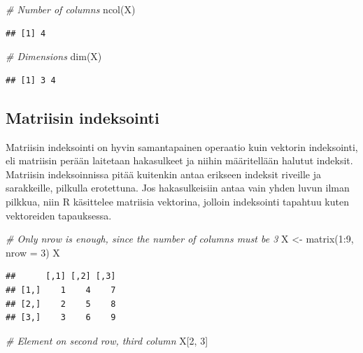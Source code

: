 \documentclass[
]{book}
\newenvironment{Shaded}{\begin{snugshade}}{\end{snugshade}}
\newcommand{\AttributeTok}[1]{\textcolor[rgb]{0.77,0.63,0.00}{#1}}
\newcommand{\CommentTok}[1]{\textcolor[rgb]{0.56,0.35,0.01}{\textit{#1}}}
\newcommand{\DecValTok}[1]{\textcolor[rgb]{0.00,0.00,0.81}{#1}}
\newcommand{\FunctionTok}[1]{\textcolor[rgb]{0.00,0.00,0.00}{#1}}
\newcommand{\NormalTok}[1]{#1}
\newcommand{\OtherTok}[1]{\textcolor[rgb]{0.56,0.35,0.01}{#1}}
\newcommand{\SpecialCharTok}[1]{\textcolor[rgb]{0.00,0.00,0.00}{#1}}
\begin{document}
\begin{Shaded}
\begin{Highlighting}[]
\CommentTok{\# Number of columns}
\FunctionTok{ncol}\NormalTok{(X)}
\end{Highlighting}
\end{Shaded}

\begin{verbatim}
## [1] 4
\end{verbatim}

\begin{Shaded}
\begin{Highlighting}[]
\CommentTok{\# Dimensions}
\FunctionTok{dim}\NormalTok{(X)}
\end{Highlighting}
\end{Shaded}

\begin{verbatim}
## [1] 3 4
\end{verbatim}

\hypertarget{matriisin-indeksointi}{%
\subsection{Matriisin indeksointi}\label{matriisin-indeksointi}}

Matriisin indeksointi on hyvin samantapainen operaatio kuin vektorin indeksointi, eli matriisin perään laitetaan hakasulkeet ja niihin määritellään halutut indeksit. Matriisin indeksoinnissa pitää kuitenkin antaa erikseen indeksit riveille ja sarakkeille, pilkulla erotettuna. Jos hakasulkeisiin antaa vain yhden luvun ilman pilkkua, niin R käsittelee matriisia vektorina, jolloin indeksointi tapahtuu kuten vektoreiden tapauksessa.

\begin{Shaded}
\begin{Highlighting}[]
\CommentTok{\# Only nrow is enough, since the number of columns must be 3}
\NormalTok{X }\OtherTok{\textless{}{-}} \FunctionTok{matrix}\NormalTok{(}\DecValTok{1}\SpecialCharTok{:}\DecValTok{9}\NormalTok{, }\AttributeTok{nrow =} \DecValTok{3}\NormalTok{)}
\NormalTok{X}
\end{Highlighting}
\end{Shaded}

\begin{verbatim}
##      [,1] [,2] [,3]
## [1,]    1    4    7
## [2,]    2    5    8
## [3,]    3    6    9
\end{verbatim}

\begin{Shaded}
\begin{Highlighting}[]
\CommentTok{\# Element on second row, third column}
\NormalTok{X[}\DecValTok{2}\NormalTok{, }\DecValTok{3}\NormalTok{]}
\end{Highlighting}
\end{Shaded}
\end{document}
